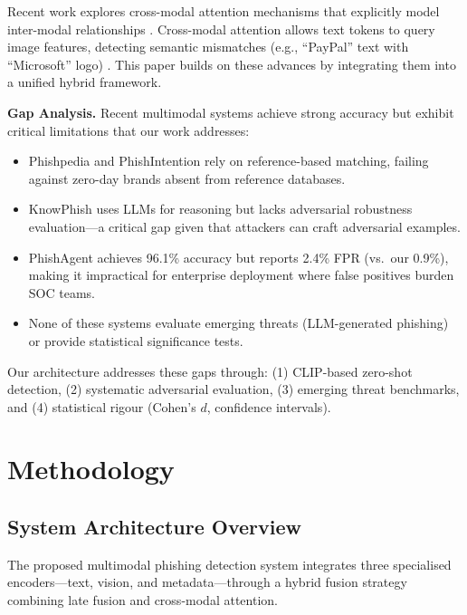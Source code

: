 \documentclass[conference]{IEEEtran}
\begin{document}
Recent work explores cross-modal attention mechanisms that explicitly model inter-modal relationships \cite{baltrusaitis_2019_multimodal}. Cross-modal attention allows text tokens to query image features, detecting semantic mismatches (e.g., ``PayPal'' text with ``Microsoft'' logo) \cite{tan_2019_lxmert}. This paper builds on these advances by integrating them into a unified hybrid framework.

\textbf{Gap Analysis.} Recent multimodal systems achieve strong accuracy but exhibit critical limitations that our work addresses:
\begin{itemize}
    \item Phishpedia \cite{lin_2021_phishpedia} and PhishIntention \cite{liu_2022_phishintention} rely on reference-based matching, failing against zero-day brands absent from reference databases.
    \item KnowPhish \cite{li_2024_knowphish} uses LLMs for reasoning but lacks adversarial robustness evaluation---a critical gap given that attackers can craft adversarial examples.
    \item PhishAgent \cite{cao_2025_phishagent} achieves 96.1\% accuracy but reports 2.4\% FPR (vs.\ our 0.9\%), making it impractical for enterprise deployment where false positives burden SOC teams.
    \item None of these systems evaluate emerging threats (LLM-generated phishing) or provide statistical significance tests.
\end{itemize}

Our architecture addresses these gaps through: (1) CLIP-based zero-shot detection, (2) systematic adversarial evaluation, (3) emerging threat benchmarks, and (4) statistical rigour (Cohen's $d$, confidence intervals).

\section{Methodology}

\subsection{System Architecture Overview}

The proposed multimodal phishing detection system integrates three specialised encoders---text, vision, and metadata---through a hybrid fusion strategy combining late fusion and cross-modal attention.
\end{document}
